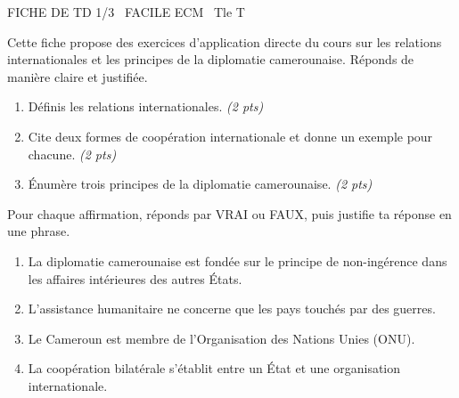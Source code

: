 \documentclass[11pt]{article}
\begin{document}
\begin{tcolorbox}[enhanced,colback=popink,colframe=popink,arc=10pt,boxrule=0pt,left=12pt,right=12pt,top=9pt,bottom=9pt]
{\color{white}\popxbold\small FICHE DE TD 1/3 \textbullet\ FACILE \hfill ECM \textbullet\ Tle T\par}
\end{tcolorbox}
\vspace{4pt}
Cette fiche propose des exercices d'application directe du cours sur les relations internationales et les principes de la diplomatie camerounaise. Réponds de manière claire et justifiée.

\begin{exercice}
\begin{enumerate}
  \item Définis les relations internationales. \emph{(2 pts)}
  \item Cite deux formes de coopération internationale et donne un exemple pour chacune. \emph{(2 pts)}
  \item Énumère trois principes de la diplomatie camerounaise. \emph{(2 pts)}
\end{enumerate}
\end{exercice}

\begin{exercice}
Pour chaque affirmation, réponds par VRAI ou FAUX, puis justifie ta réponse en une phrase.
\begin{enumerate}
  \item La diplomatie camerounaise est fondée sur le principe de non-ingérence dans les affaires intérieures des autres États.
  \item L'assistance humanitaire ne concerne que les pays touchés par des guerres.
  \item Le Cameroun est membre de l'Organisation des Nations Unies (ONU).
  \item La coopération bilatérale s'établit entre un État et une organisation internationale.
\end{enumerate}
\end{exercice}
\end{document}
